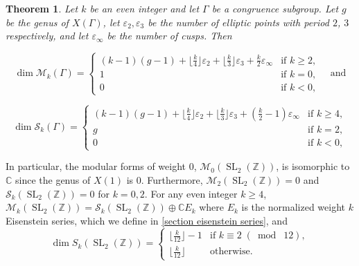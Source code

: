 \documentclass[10pt,leqno,twoside]{article}
\theoremstyle{plain}
\newtheorem{theorem}[lem]{Theorem}
\theoremstyle{definition}
\numberwithin{equation}{section}
\numberwithin{lem}{section}
\DeclareMathOperator{\SL}{SL}
\newcommand{\smod}[1]{\;(\bmod\; #1)}
\newcommand{\slz}{\SL_2(\mathbb{Z})}
\begin{document}
\begin{theorem}
    Let $k$ be an even integer and let $\varGamma$ be a congruence subgroup. Let $g$ be the genus of $X(\varGamma)$, let $\varepsilon_2,\varepsilon_3$ be the number of elliptic points with period $2$, $3$ respectively, and let $\varepsilon_\infty$ be the number of cusps. Then

    \[\dim \mathcal M_k(\varGamma) = \begin{cases}
        (k-1)(g-1) + \lfloor\frac{k}{4}\rfloor\varepsilon_2 + \lfloor\frac{k}{3}\rfloor\varepsilon_3 + \frac{k}{2}\varepsilon_\infty & \text{if $k\geq 2$},\\
        1 & \text{if $k = 0$},\\
        0 & \text{if $k<0$},
    \end{cases} \quad \text{and}\]

    \[\dim \mathcal S_k(\varGamma) = \begin{cases}
        (k-1)(g-1) + \lfloor\frac{k}{4}\rfloor\varepsilon_2 + \lfloor\frac{k}{3}\rfloor\varepsilon_3 + (\frac{k}{2}-1)\varepsilon_\infty & \text{if $k\geq 4$},\\
        g & \text{if $k = 2$},\\
        0 & \text{if $k<0$},
    \end{cases}\]
\end{theorem}

In particular, the modular forms of weight $0$, $\mathcal M_0(\slz)$, is isomorphic to $\mathbb C$ since the genus of $X(1)$ is $0$. Furthermore, $\mathcal M_2(\slz) = 0$ and $\mathcal S_k(\slz) = 0$ for $k = 0,2$. For any even integer $k\geq 4$, $\mathcal M_k(\slz) = \mathcal S_k(\slz)\oplus \mathbb CE_k$ where $E_k$ is the normalized weight $k$ Eisenstein series, which we define in \cref{section eisenstein series}, and \[\dim S_k(\slz) = \begin{cases}
    \lfloor \frac{k}{12}\rfloor - 1 & \text{if $k\equiv 2 \smod{12}$}, \\
    \lfloor \frac{k}{12}\rfloor & \text{otherwise.}
\end{cases}\]
\end{document}

